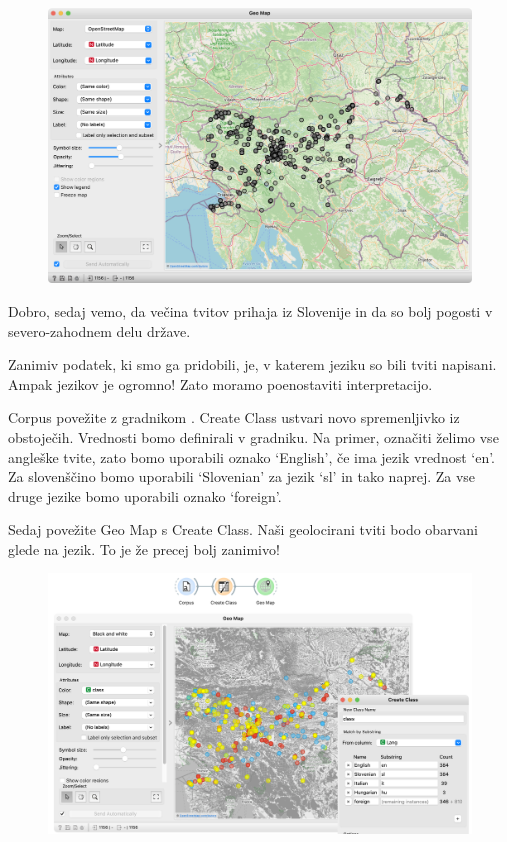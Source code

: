 \begin{figure}[h]
    \includegraphics[width=\linewidth]{geo1.png}%
    \caption{}
    \label{fig:012-geo1}
  \end{figure}

Dobro, sedaj vemo, da večina tvitov prihaja iz Slovenije in da so bolj pogosti v severo-zahodnem delu države.

Zanimiv podatek, ki smo ga pridobili, je, v katerem jeziku so bili tviti napisani. Ampak jezikov je ogromno! Zato moramo poenostaviti interpretacijo.

Corpus povežite z gradnikom . Create Class ustvari novo spremenljivko iz obstoječih. Vrednosti bomo definirali v gradniku. Na primer, označiti želimo vse angleške tvite, zato bomo uporabili oznako ‘English’, če ima jezik vrednost ‘en’. Za slovenščino bomo uporabili ‘Slovenian’ za jezik ‘sl’ in tako naprej. Za vse druge jezike bomo uporabili oznako ‘foreign’.

Sedaj povežite Geo Map s Create Class. Naši geolocirani tviti bodo obarvani glede na jezik. To je že precej bolj zanimivo!

\begin{figure}[h]
    \includegraphics[width=\linewidth]{geo2.png}%
    \caption{}
    \label{fig:012-geo2}
\end{figure}